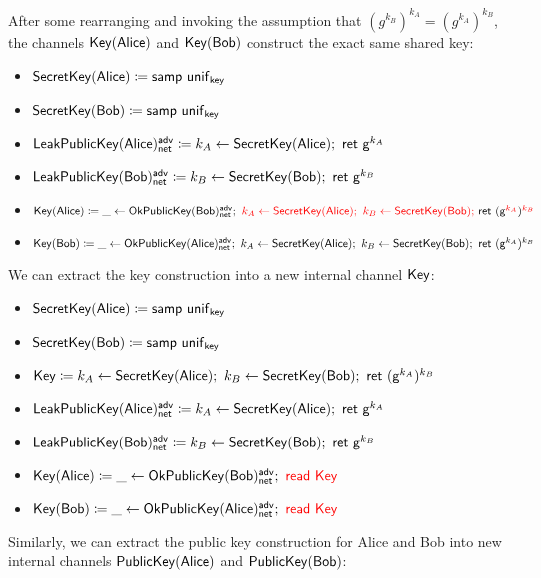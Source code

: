 \noindent After some rearranging and invoking the assumption that $(g^{k_B})^{k_A} = (g^{k_A})^{k_B}$, the channels $\mathsf{Key}(\mathsf{Alice})$ and $\mathsf{Key}(\mathsf{Bob})$ construct the exact same shared key:

\begin{itemize}
\item $\mathsf{SecretKey}(\mathsf{Alice}) \coloneqq \mathsf{samp} \ \mathsf{unif}_{\mathsf{key}}$
\item $\mathsf{SecretKey}(\mathsf{Bob}) \coloneqq \mathsf{samp} \ \mathsf{unif}_{\mathsf{key}}$
\item $\LeakPublicKey(\Alice)^\adv_\net \coloneqq k_A \leftarrow \SecretKey(\Alice); \ \ret{\gen^{k_A}}$
\item $\LeakPublicKey(\Bob)^\adv_\net \coloneqq k_B \leftarrow \SecretKey(\Bob); \ \ret{\gen^{k_B}}$
\item $\mathsf{Key}(\mathsf{Alice}) \coloneqq \_ \leftarrow \mathsf{OkPublicKey}(\mathsf{Bob})^{\mathsf{adv}}_{\mathsf{net}}; \ {\color{red} k_A \leftarrow \mathsf{SecretKey}(\mathsf{Alice}); \ k_B \leftarrow \mathsf{SecretKey}(\mathsf{Bob}); \ } \mathsf{ret} \ (\mathsf{g}^{\color{red} k_A})^{\color{red} k_B}$
\item $\Key(\Bob) \coloneqq \_ \leftarrow \OkPublicKey(\Alice)^\adv_\net; \ k_A \leftarrow \SecretKey(\Alice); \ k_B \leftarrow \SecretKey(\Bob); \ \ret{(\gen^{k_A})^{k_B}}$
\end{itemize}

\noindent We can extract the key construction into a new internal channel $\mathsf{Key}$:

\begin{itemize}
\item $\mathsf{SecretKey}(\mathsf{Alice}) \coloneqq \mathsf{samp} \ \mathsf{unif}_{\mathsf{key}}$
\item $\mathsf{SecretKey}(\mathsf{Bob}) \coloneqq \mathsf{samp} \ \mathsf{unif}_{\mathsf{key}}$
\item {\color{red} $\Key \coloneqq k_A \leftarrow \SecretKey(\Alice); \ k_B \leftarrow \SecretKey(\Bob); \ \ret{(\gen^{k_A})^{k_B}}$}
\item $\LeakPublicKey(\Alice)^\adv_\net \coloneqq k_A \leftarrow \SecretKey(\Alice); \ \ret{\gen^{k_A}}$
\item $\LeakPublicKey(\Bob)^\adv_\net \coloneqq k_B \leftarrow \SecretKey(\Bob); \ \ret{\gen^{k_B}}$
\item $\mathsf{Key}(\mathsf{Alice}) \coloneqq \_ \leftarrow \mathsf{OkPublicKey}(\mathsf{Bob})^{\mathsf{adv}}_{\mathsf{net}}; \ {\color{red} \mathsf{read} \ \mathsf{Key}}$
\item $\mathsf{Key}(\mathsf{Bob}) \coloneqq \_ \leftarrow \mathsf{OkPublicKey}(\mathsf{Alice})^{\mathsf{adv}}_{\mathsf{net}}; \ {\color{red} \mathsf{read} \ \mathsf{Key}}$
\end{itemize}

\noindent Similarly, we can extract the public key construction for Alice and Bob into new internal channels $\mathsf{PublicKey}(\mathsf{Alice})$ and $\mathsf{PublicKey}(\mathsf{Bob})$:

